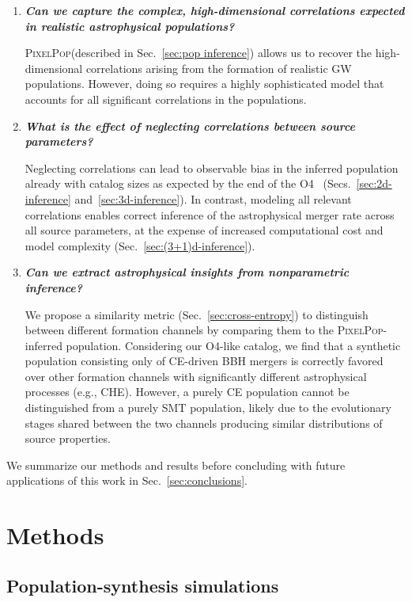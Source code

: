 \documentclass[twocolumn, twocolappendix]{aastex631}
\newcommand{\PixelPop}{\textsc{PixelPop}\xspace}
\begin{document}
\begin{enumerate}
\item \textit{\textbf{Can we capture the complex, high-dimensional correlations expected in realistic astrophysical populations?}} 

\PixelPop (described in Sec.~\ref{sec:pop inference}) allows us to recover the high-dimensional correlations arising from the formation of realistic \ac{GW} populations. However, doing so requires a highly sophisticated model that accounts for all significant correlations in the populations.

\item \textit{\textbf{What is the effect of neglecting correlations between source parameters?
}}

Neglecting correlations can lead to observable bias in the inferred population already with catalog sizes as expected by the end of the \ac{O4}~\citep{Capote:2024rmo} (Secs.~\ref{sec:2d-inference} and~\ref{sec:3d-inference}).
In contrast, modeling all relevant correlations enables correct inference of the astrophysical merger rate across all source parameters, at the expense of increased computational cost and model complexity (Sec.~\ref{sec:(3+1)d-inference}).

\item \textit{\textbf{Can we extract astrophysical insights from nonparametric inference?
}}

We propose a similarity metric
(Sec.~\ref{sec:cross-entropy}) 
to distinguish between different formation channels by comparing them to the \PixelPop-inferred population.
Considering our \ac{O4}-like catalog, we find that a synthetic population consisting only of CE-driven BBH mergers is correctly favored over other formation channels with significantly different astrophysical processes (e.g., \ac{CHE}). However, a purely \ac{CE} population cannot be distinguished from a purely \ac{SMT} population,
likely due to the evolutionary stages shared between the two channels producing similar distributions of source properties.
\end{enumerate}

We summarize our methods and results before concluding with future applications of this work in Sec.~\ref{sec:conclusions}.

\section{Methods}
\label{sec:methods}

\subsection{Population-synthesis simulations}
\label{sec:pop synth simulations}
\end{document}
